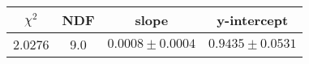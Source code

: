 \begin{tabular}{|c|c|c|c|}

\hline
$\chi^{2}$ & NDF & slope & y-intercept  \\
\hline
2.0276 & 9.0 & $0.0008\pm0.0004$ & $0.9435\pm0.0531$ \\
\hline

\end{tabular}